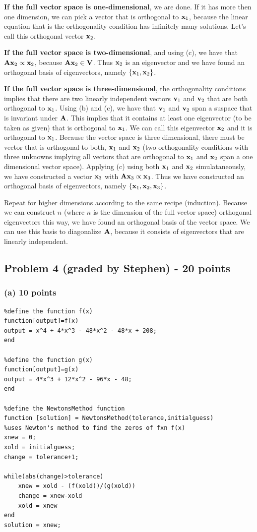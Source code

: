 \documentclass[11pt]{article}
\begin{document}
\textbf{If the full vector space is one-dimensional}, we are done. If it has more then one dimension, we can pick a vector that is orthogonal to $\mathbf{x}_1$, because the linear equation that is the orthogonality condition has infinitely many solutions. Let's call this orthogonal vector $\mathbf{x}_2$. 

\textbf{If the full vector space is two-dimensional}, and using (c), we have that $\mathbf{A}\mathbf{x}_2 \propto \mathbf{x}_2$, because $\mathbf{A}\mathbf{x}_2 \in \mathbf{V}$. Thus $\mathbf{x}_2$ is an eigenvector and we have found an orthogonal basis of eigenvectors, namely $\{\mathbf{x}_1, \mathbf{x}_2 \}$. 

\textbf{If the full vector space is three-dimensional}, the orthogonality conditions implies that there are two linearly independent vectors $\mathbf{v}_1$ and $\mathbf{v}_2$ that are both orthogonal to $\mathbf{x}_1$. Using (b) and (c), we have that $\mathbf{v}_1$ and $\mathbf{v}_2$ span a suspace that is invariant under $\mathbf{A}$. This implies that it contains at least one eigenvector (to be taken as given) that is orthogonal to $\mathbf{x}_1$. We can call this eigenvector $\mathbf{x}_2$ and it is orthogonal to $\mathbf{x}_1$. Because the vector space is three dimensional, there must be vector that is orthogonal to both, $\mathbf{x}_1$ and $\mathbf{x}_2$ (two orthogonality conditions with three unknowns implying all vectors that are orthogonal to $\mathbf{x}_1$ and $\mathbf{x}_2$ span a one dimensional vector space). Applying (c) using both $\mathbf{x}_1$ and $\mathbf{x}_2$ simulataneously, we have constructed a vector $\mathbf{x}_3$ with $\mathbf{A}\mathbf{x}_3 \propto \mathbf{x}_3$. Thus we have constructed an orthogonal basis of eigenvectors, namely $\{\mathbf{x}_1, \mathbf{x}_2 , \mathbf{x}_3\}$.

Repeat for higher dimensions according to the same recipe (induction). Because we can construct $n$ (where $n$ is the dimension of the full vector space) orthogonal eigenvectors this way, we have found an orthogonal basis of the vector space. We can use this basis to diagonalize $\mathbf{A}$, because it consists of eigenvectors that are linearly independent.

\subsection*{Problem 4 (graded by Stephen) - 20 points}
\subsubsection*{(a) 10 points}

\begin{verbatim}
%define the function f(x)
function[output]=f(x)
output = x^4 + 4*x^3 - 48*x^2 - 48*x + 208;
end

%define the function g(x)
function[output]=g(x)
output = 4*x^3 + 12*x^2 - 96*x - 48;
end

%define the NewtonsMethod function
function [solution] = NewtonsMethod(tolerance,initialguess)
%uses Newton's method to find the zeros of fxn f(x)
xnew = 0;
xold = initialguess;
change = tolerance+1;

while(abs(change)>tolerance)
    xnew = xold - (f(xold))/(g(xold))
    change = xnew-xold
    xold = xnew
end
solution = xnew;


\end{verbatim}
\end{document}
